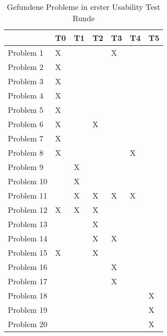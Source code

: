 \begin{table}[H]
    \caption{Gefundene Probleme in erster Usability Test Runde}\label{tbl:1stUsabilityTestsProblems}
    \begin{tabular}{l|l|l|l|l|l|l}
                & T0    & T1    & T2    & T3    & T4    & T5    \\ \hline
    Problem 1   & X     &       &       & X     &       &       \\
    Problem 2   & X     &       &       &       &       &       \\
    Problem 3   & X     &       &       &       &       &       \\
    Problem 4   & X     &       &       &       &       &       \\
    Problem 5   & X     &       &       &       &       &       \\
    Problem 6   & X     &       & X     &       &       &       \\
    Problem 7   & X     &       &       &       &       &       \\
    Problem 8   & X     &       &       &       & X     &       \\
    Problem 9   &       & X     &       &       &       &       \\
    Problem 10  &       & X     &       &       &       &       \\
    Problem 11  &       & X     & X     & X     & X     &       \\
    Problem 12  & X     & X     & X     &       &       &       \\
    Problem 13  &       &       & X     &       &       &       \\
    Problem 14  &       &       & X     & X     &       &       \\
    Problem 15  & X     &       & X     &       &       &       \\
    Problem 16  &       &       &       & X     &       &       \\
    Problem 17  &       &       &       & X     &       &       \\
    Problem 18  &       &       &       &       &       & X     \\
    Problem 19  &       &       &       &       &       & X     \\
    Problem 20  &       &       &       &       &       & X     \\
    \end{tabular}    
\end{table}

